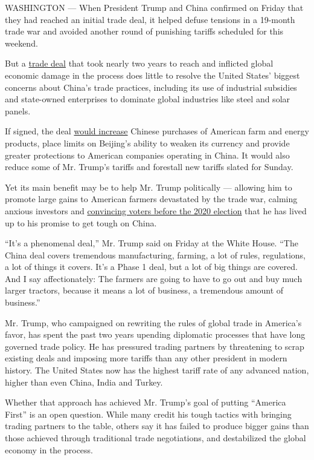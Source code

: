 WASHINGTON --- When President Trump and China confirmed on Friday that
they had reached an initial trade deal, it helped defuse tensions in a
19-month trade war and avoided another round of punishing tariffs
scheduled for this weekend.

But a
\href{https://www.nytimes.com/2019/12/12/business/economy/trump-china-trade-deal.html}{trade
deal} that took nearly two years to reach and inflicted global economic
damage in the process does little to resolve the United States' biggest
concerns about China's trade practices, including its use of industrial
subsidies and state-owned enterprises to dominate global industries like
steel and solar panels.

If signed, the deal
\href{https://ustr.gov/sites/default/files/US-China-Agreement-Fact-Sheet.pdf}{would
increase} Chinese purchases of American farm and energy products, place
limits on Beijing's ability to weaken its currency and provide greater
protections to American companies operating in China. It would also
reduce some of Mr. Trump's tariffs and forestall new tariffs slated for
Sunday.

Yet its main benefit may be to help Mr. Trump politically --- allowing
him to promote large gains to American farmers devastated by the trade
war, calming anxious investors and
\href{https://www.nytimes.com/2019/12/06/us/politics/trump-economy-impeachment.html}{convincing
voters before the 2020 election} that he has lived up to his promise to
get tough on China.

``It's a phenomenal deal,'' Mr. Trump said on Friday at the White House.
``The China deal covers tremendous manufacturing, farming, a lot of
rules, regulations, a lot of things it covers. It's a Phase 1 deal, but
a lot of big things are covered. And I say affectionately: The farmers
are going to have to go out and buy much larger tractors, because it
means a lot of business, a tremendous amount of business.''

Mr. Trump, who campaigned on rewriting the rules of global trade in
America's favor, has spent the past two years upending diplomatic
processes that have long governed trade policy. He has pressured trading
partners by threatening to scrap existing deals and imposing more
tariffs than any other president in modern history. The United States
now has the highest tariff rate of any advanced nation, higher than even
China, India and Turkey.

Whether that approach has achieved Mr. Trump's goal of putting ``America
First'' is an open question. While many credit his tough tactics with
bringing trading partners to the table, others say it has failed to
produce bigger gains than those achieved through traditional trade
negotiations, and destabilized the global economy in the process.

